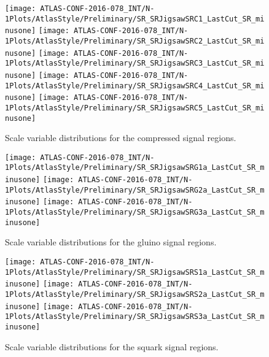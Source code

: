\begin{figure}[tbph]
\begin{center}
\texttt{[image: ATLAS-CONF-2016-078\_INT/N-1Plots/AtlasStyle/Preliminary/SR\_SRJigsawSRC1\_LastCut\_SR\_minusone]}
\texttt{[image: ATLAS-CONF-2016-078\_INT/N-1Plots/AtlasStyle/Preliminary/SR\_SRJigsawSRC2\_LastCut\_SR\_minusone]}
\texttt{[image: ATLAS-CONF-2016-078\_INT/N-1Plots/AtlasStyle/Preliminary/SR\_SRJigsawSRC3\_LastCut\_SR\_minusone]}
\texttt{[image: ATLAS-CONF-2016-078\_INT/N-1Plots/AtlasStyle/Preliminary/SR\_SRJigsawSRC4\_LastCut\_SR\_minusone]}
\texttt{[image: ATLAS-CONF-2016-078\_INT/N-1Plots/AtlasStyle/Preliminary/SR\_SRJigsawSRC5\_LastCut\_SR\_minusone]}
\end{center}
\caption{Scale variable distributions for the compressed signal regions.}
\label{fig:src_scale}
\end{figure}

\begin{figure}[tbph]
\begin{center}
\texttt{[image: ATLAS-CONF-2016-078\_INT/N-1Plots/AtlasStyle/Preliminary/SR\_SRJigsawSRG1a\_LastCut\_SR\_minusone]}
\texttt{[image: ATLAS-CONF-2016-078\_INT/N-1Plots/AtlasStyle/Preliminary/SR\_SRJigsawSRG2a\_LastCut\_SR\_minusone]}
\texttt{[image: ATLAS-CONF-2016-078\_INT/N-1Plots/AtlasStyle/Preliminary/SR\_SRJigsawSRG3a\_LastCut\_SR\_minusone]}
\end{center}
\caption{Scale variable distributions for the gluino signal regions.}
\label{fig:srg_scale}
\end{figure}

\begin{figure}[tbph]
\begin{center}
\texttt{[image: ATLAS-CONF-2016-078\_INT/N-1Plots/AtlasStyle/Preliminary/SR\_SRJigsawSRS1a\_LastCut\_SR\_minusone]}
\texttt{[image: ATLAS-CONF-2016-078\_INT/N-1Plots/AtlasStyle/Preliminary/SR\_SRJigsawSRS2a\_LastCut\_SR\_minusone]}
\texttt{[image: ATLAS-CONF-2016-078\_INT/N-1Plots/AtlasStyle/Preliminary/SR\_SRJigsawSRS3a\_LastCut\_SR\_minusone]}
\end{center}
\caption{Scale variable distributions for the squark signal regions.}
\label{fig:srs_scale}
\end{figure}
